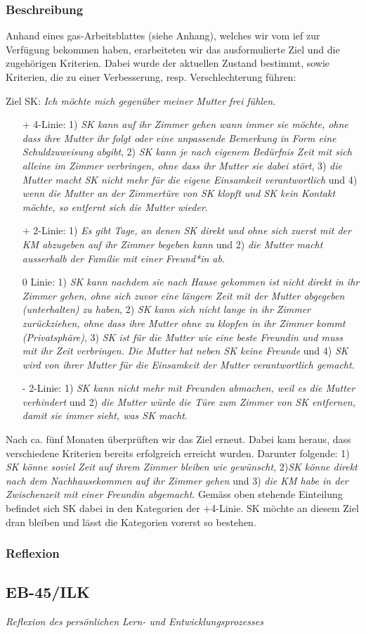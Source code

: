 \subsubsection{Beschreibung}
Anhand eines \ac{gas}-Arbeitsblattes (siehe Anhang), welches wir vom \ac{ief} zur Verfügung bekommen haben, erarbeiteten wir das ausformulierte Ziel und die zugehörigen Kriterien. Dabei wurde der aktuellen Zustand bestimmt, sowie Kriterien, die zu einer Verbesserung, resp. Verschlechterung führen:

Ziel SK: \textit{Ich möchte mich gegenüber meiner Mutter frei fühlen}.
\begin{itemize}
   \item[+] 4-Linie: 1) \textit{SK kann auf ihr Zimmer gehen wann immer sie möchte, ohne dass ihre Mutter ihr folgt oder eine unpassende Bemerkung in Form eine Schuldzuweisung abgibt}, 2) \textit{SK kann je nach eigenem Bedürfnis Zeit mit sich alleine im Zimmer verbringen, ohne dass ihr Mutter sie dabei stört}, 3) \textit{die Mutter macht SK nicht mehr für die eigene Einsamkeit verantwortlich} und 4) \textit{wenn die Mutter an der Zimmertüre von SK klopft und SK kein Kontakt möchte, so entfernt sich die Mutter wieder}.
   \item[+] 2-Linie: 1) \textit{Es gibt Tage, an denen SK direkt und ohne sich zuerst mit der KM abzugeben auf ihr Zimmer begeben kann} und 2) \textit{die Mutter macht ausserhalb der Familie mit einer Freund*in ab}.
  \item[0] Linie: 1) \textit{SK kann nachdem sie nach Hause gekommen ist nicht direkt in ihr Zimmer gehen, ohne sich zuvor eine längere Zeit mit der Mutter abgegeben (unterhalten) zu haben}, 2) \textit{SK kann sich nicht lange in ihr Zimmer zurückziehen, ohne dass ihre Mutter ohne zu klopfen in ihr Zimmer kommt (Privatsphäre)}, 3) \textit{SK ist für die Mutter wie eine beste Freundin und muss mit ihr Zeit verbringen. Die Mutter hat neben SK keine Freunde} und 4) \textit{SK wird von ihrer Mutter für die Einsamkeit der Mutter verantwortlich gemacht}.
 \item[-] 2-Linie: 1) \textit{SK kann nicht mehr mit Freunden abmachen, weil es die Mutter verhindert} und 2) \textit{die Mutter würde die Türe zum Zimmer von SK entfernen, damit sie immer sieht, was SK macht}.
\end{itemize}
Nach ca. fünf Monaten überprüften wir das Ziel erneut. Dabei kam heraus, dass verschiedene Kriterien bereits erfolgreich erreicht wurden. Darunter folgende: 1) \textit{SK könne soviel Zeit auf ihrem Zimmer bleiben wie gewünscht}, 2)\textit{SK könne direkt nach dem Nachhausekommen auf ihr Zimmer gehen} und 3) \textit{die KM habe in der Zwischenzeit mit einer Freundin abgemacht}. Gemäss oben stehende Einteilung befindet sich SK dabei in den Kategorien der +4-Linie. SK möchte an diesem Ziel dran bleiben und lässt die Kategorien vorerst so bestehen. 

\subsubsection{Reflexion}


\subsection{EB-45/ILK}

\textit{Reflexion des persönlichen Lern- und Entwicklungsprozesses}
 